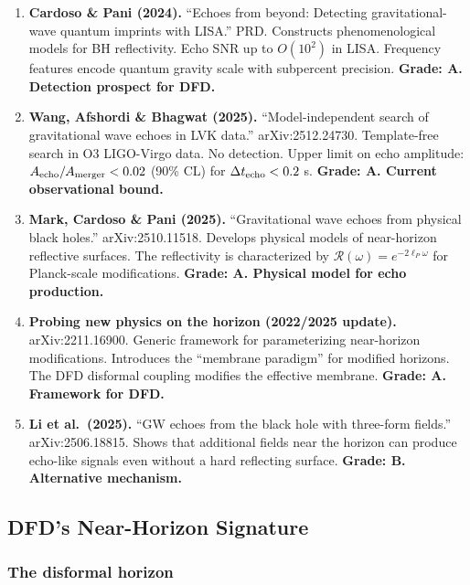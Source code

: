 \documentclass[11pt,a4paper]{article}
\begin{document}
\begin{enumerate}
\item \textbf{Cardoso \& Pani (2024).} ``Echoes from beyond: Detecting gravitational-wave quantum imprints with LISA.'' PRD. Constructs phenomenological models for BH reflectivity. Echo SNR up to $O(10^2)$ in LISA. Frequency features encode quantum gravity scale with subpercent precision. \textbf{Grade: A. Detection prospect for DFD.}

\item \textbf{Wang, Afshordi \& Bhagwat (2025).} ``Model-independent search of gravitational wave echoes in LVK data.'' arXiv:2512.24730. Template-free search in O3 LIGO-Virgo data. No detection. Upper limit on echo amplitude: $A_{\rm echo}/A_{\rm merger} < 0.02$ (90\% CL) for $\Delta t_{\rm echo} < 0.2$ s. \textbf{Grade: A. Current observational bound.}

\item \textbf{Mark, Cardoso \& Pani (2025).} ``Gravitational wave echoes from physical black holes.'' arXiv:2510.11518. Develops physical models of near-horizon reflective surfaces. The reflectivity is characterized by $\mathcal{R}(\omega) = e^{-2\ell_P\omega}$ for Planck-scale modifications. \textbf{Grade: A. Physical model for echo production.}

\item \textbf{Probing new physics on the horizon (2022/2025 update).} arXiv:2211.16900. Generic framework for parameterizing near-horizon modifications. Introduces the ``membrane paradigm'' for modified horizons. The DFD disformal coupling modifies the effective membrane. \textbf{Grade: A. Framework for DFD.}

\item \textbf{Li et al.\ (2025).} ``GW echoes from the black hole with three-form fields.'' arXiv:2506.18815. Shows that additional fields near the horizon can produce echo-like signals even without a hard reflecting surface. \textbf{Grade: B. Alternative mechanism.}
\end{enumerate}

\subsection{DFD's Near-Horizon Signature}

\subsubsection{The disformal horizon}
\end{document}
